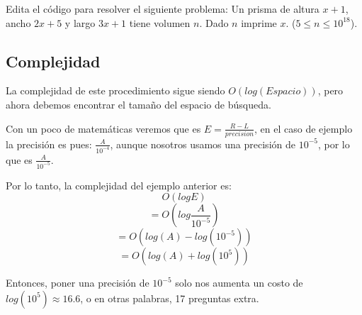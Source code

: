\begin{exercise}
	Edita el código para resolver el siguiente problema: Un prisma de altura \(x+1\), ancho \(2x+5\) y largo \(3x+1\) tiene volumen \(n\). Dado \(n\) imprime \(x\). (\(5\leq n \leq 10^{18}\)).
\end{exercise}

\subsection{Complejidad}
La complejidad de este procedimiento sigue siendo \(O(log(Espacio))\), pero ahora debemos encontrar el tamaño del espacio de búsqueda. 

Con un poco de matemáticas veremos que es \(E=\frac{R-L}{precision}\), en el caso de ejemplo la precisión es pues: \(\frac{A}{10^{-4}}\), aunque nosotros usamos una precisión de \(10^{-5}\), por lo que es \(\frac{A}{10^{-5}}\).

Por lo tanto, la complejidad del ejemplo anterior es:
\[O(logE)\]
\[ = O(log\frac{A}{10^{-5}})\]
\[ = O(log(A)-log({10^{-5}}))\]
\[ = O(log(A)+log({10^{5}}))\]

Entonces, poner una precisión de \(10^{-5}\) solo nos aumenta un costo de \(log(10^5)\approx 16.6\), o en otras palabras, 17 preguntas extra.

